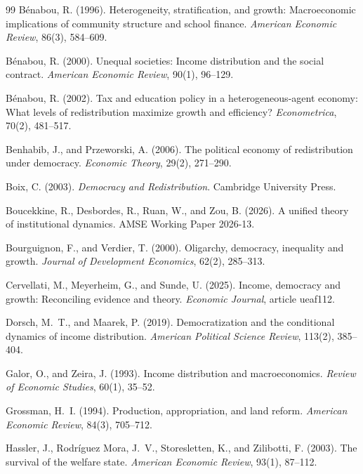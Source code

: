 \documentclass[11pt]{article}
\theoremstyle{remark}
\begin{document}
\begin{thebibliography}{99}
B\'enabou, R. (1996).
Heterogeneity, stratification, and growth: Macroeconomic implications of community structure and school finance.
\emph{American Economic Review}, 86(3), 584--609.

B\'enabou, R. (2000).
Unequal societies: Income distribution and the social contract.
\emph{American Economic Review}, 90(1), 96--129.

B\'enabou, R. (2002).
Tax and education policy in a heterogeneous-agent economy: What levels of redistribution maximize growth and efficiency?
\emph{Econometrica}, 70(2), 481--517.

Benhabib, J., and Przeworski, A. (2006).
The political economy of redistribution under democracy.
\emph{Economic Theory}, 29(2), 271--290.

Boix, C. (2003).
\emph{Democracy and Redistribution}.
Cambridge University Press.

Boucekkine, R., Desbordes, R., Ruan, W., and Zou, B. (2026).
A unified theory of institutional dynamics.
AMSE Working Paper 2026-13.

Bourguignon, F., and Verdier, T. (2000).
Oligarchy, democracy, inequality and growth.
\emph{Journal of Development Economics}, 62(2), 285--313.

Cervellati, M., Meyerheim, G., and Sunde, U. (2025).
Income, democracy and growth: Reconciling evidence and theory.
\emph{Economic Journal}, article ueaf112.

Dorsch, M.~T., and Maarek, P. (2019).
Democratization and the conditional dynamics of income distribution.
\emph{American Political Science Review}, 113(2), 385--404.

Galor, O., and Zeira, J. (1993).
Income distribution and macroeconomics.
\emph{Review of Economic Studies}, 60(1), 35--52.

Grossman, H.~I. (1994).
Production, appropriation, and land reform.
\emph{American Economic Review}, 84(3), 705--712.

Hassler, J., Rodr\'iguez Mora, J.~V., Storesletten, K., and Zilibotti, F. (2003).
The survival of the welfare state.
\emph{American Economic Review}, 93(1), 87--112.


\end{thebibliography}
\end{document}
